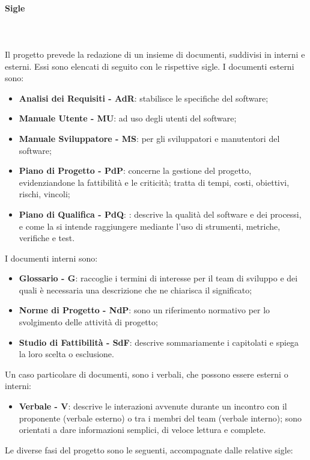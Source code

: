 		\paragraph{Sigle} \mbox{}\\ \mbox{}\\
		Il progetto prevede la redazione di un insieme di documenti, suddivisi in interni e esterni. Essi sono elencati di seguito con le rispettive sigle.\newline
		I documenti esterni sono:	
		\begin{itemize}
			\item \textbf{Analisi dei Requisiti - AdR}: stabilisce le specifiche del software;
			\item \textbf{Manuale Utente - MU}: ad uso degli utenti del software;
			\item \textbf{Manuale Sviluppatore - MS}: per gli sviluppatori e manutentori del software;
			\item \textbf{Piano di Progetto - PdP}:  concerne la gestione del progetto, evidenziandone la fattibilità e le criticità; tratta di tempi, costi, obiettivi, rischi, vincoli;
			\item \textbf{Piano di Qualifica - PdQ}: : descrive la qualità del software e dei processi, e come la si intende raggiungere mediante l'uso di strumenti, metriche, verifiche e test.
		\end{itemize}
		I documenti interni sono:
		\begin{itemize}
			\item \textbf{Glossario - G}: raccoglie i termini di interesse per il team di sviluppo e dei quali è necessaria una descrizione che ne chiarisca il significato;
			\item \textbf{Norme di Progetto - NdP}: sono un riferimento normativo per lo svolgimento delle attività di progetto;
			\item \textbf{Studio di Fattibilità - SdF}: descrive sommariamente i capitolati e spiega la loro scelta o esclusione.
		\end{itemize}
		Un caso particolare di documenti, sono i verbali, che possono essere esterni o interni:
		\begin{itemize}
			\item \textbf{Verbale - V}: descrive le interazioni avvenute durante un incontro con il proponente (verbale esterno) o tra i membri del team (verbale interno); sono orientati a dare informazioni semplici, di veloce lettura e complete.
		\end{itemize}
		Le diverse fasi del progetto sono le seguenti, accompagnate dalle relative sigle:
